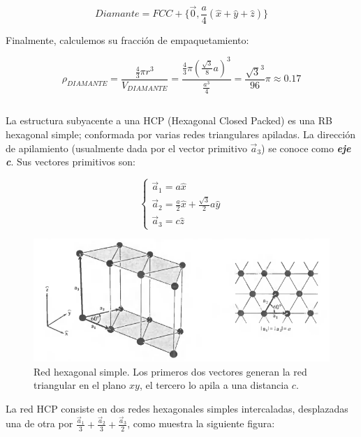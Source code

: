 \documentclass[a4paper]{article}
\begin{document}
$$ Diamante = FCC + \{ \vec{0}, \frac{a}{4}(\hat{x} + \hat{y} + \hat{z})\}$$

Finalmente, calculemos su fracci\'on de empaquetamiento:

$$ \rho_{DIAMANTE} = \frac{\frac{4}{3}\pi r^{3}}{V_{DIAMANTE}} = \frac{\frac{4}{3}\pi (\frac{\sqrt{3}}{8}a)^{3}}{\frac{a^{3}}{4}} = \frac{\sqrt{3}^{3}}{96}\pi \approx 0.17$$

\subsection{}

La estructura subyacente a una HCP (Hexagonal Closed Packed) es una RB hexagonal simple; conformada por varias redes triangulares apiladas. La direcci\'on de apilamiento (usualmente dada por el vector primitivo $\vec{a}_{3}$) se conoce como \textbf{\textit{eje c}}. Sus vectores primitivos son:

$$\begin{cases}
\vec{a}_{1} = a\hat{x} \\
\vec{a}_{2} = \frac{a}{2}\hat{x} + \frac{\sqrt{3}}{2}a\hat{y} \\
\vec{a}_{3} = c\hat{z}
\end{cases}$$

\begin{figure}[H]
  \centering
  \includegraphics[width=0.9\linewidth,height=0.4\linewidth]{red3d_triangular.png}
  \caption{Red hexagonal simple. Los primeros dos vectores generan la red triangular en el plano $xy$, el tercero lo apila a una distancia $c$.}
  \label{fig:red3d_triangular}
\end{figure}

La red HCP consiste en dos redes hexagonales simples intercaladas, desplazadas una de otra por $\frac{\vec{a}_{1}}{3} + \frac{\vec{a}_{2}}{3} + \frac{\vec{a}_{3}}{2}$, como muestra la siguiente figura:
\end{document}
